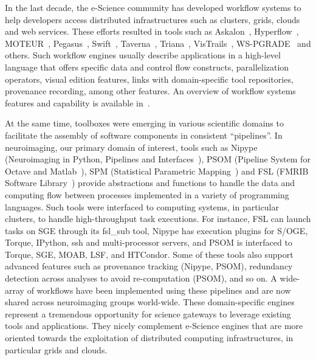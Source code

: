 \documentclass[preprint,3p,twocolumn]{elsarticle}
\begin{document}
In the last decade, the e-Science community has developed workflow
systems to help developers access distributed infrastructures such as
clusters, grids, clouds and web services. These efforts resulted in
tools such as Askalon~\cite{fahringer2005askalon},
Hyperflow~\cite{balis2016hyperflow}, MOTEUR~\cite{GLAT-08i},
Pegasus~\cite{deelman2005pegasus,Deelman201517},
Swift~\cite{zhao2007swift}, Taverna~\cite{oinn2004taverna},
Triana~\cite{taylor2007triana}, VisTrails~\cite{callahan2006managing},
WS-PGRADE~\cite{Kacsuk2012} and others. Such workflow engines usually
describe applications in a high-level language that offers specific
data and control flow constructs, parallelization operators, visual
edition features, links with domain-specific tool repositories,
provenance recording, among other features. An overview of workflow
systems features and capability is available
in~\cite{deelman2009workflows}.

At the same time, toolboxes were emerging in various scientific
domains to facilitate the assembly of software components in
consistent ``pipelines''. In neuroimaging, our primary domain of
interest, tools such as Nipype (Neuroimaging in Python, Pipelines and
Interfaces~\cite{gorgolewski2011nipype}), PSOM (Pipeline System for
Octave and Matlab~\cite{bellec2012pipeline}), SPM (Statistical
Parametric Mapping~\cite{ashburner2011spm}) and FSL (FMRIB Software
Library~\cite{Jenkinson2012782}) provide abstractions and functions to
handle the data and computing flow between processes implemented in a
variety of programming languages. Such tools were interfaced to
computing systems, in particular clusters, to handle high-throughput
task executions. For instance, FSL can launch tasks on SGE through its
fsl\_sub tool, Nipype has execution plugins for S/OGE, Torque,
IPython, ssh and multi-processor servers, and PSOM is interfaced to
Torque, SGE, MOAB, LSF, and HTCondor. Some of these tools also support
advanced features such as provenance tracking (Nipype, PSOM),
redundancy detection across analyses to avoid re-computation (PSOM),
and so on. A wide-array of workflows have been implemented using these
pipelines and are now shared across neuroimaging groups
world-wide. These
domain-specific engines represent a tremendous opportunity for science
gateways to leverage existing tools and applications. They nicely
complement e-Science engines that are more oriented towards the
exploitation of distributed computing infrastructures, in particular
grids and clouds.
\end{document}
